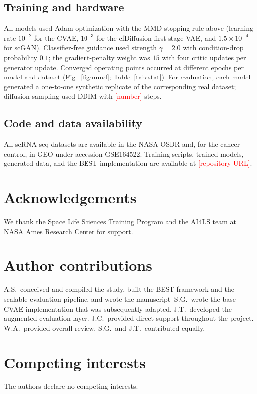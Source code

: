\documentclass[11pt]{article}
\newcommand{\fides}{BEST}
\newcommand{\res}[1]{\textcolor{red}{[#1]}}
\begin{document}
\subsection{Training and hardware}
All models used Adam optimization with the MMD stopping rule above (learning rate $10^{-2}$ for the CVAE, $10^{-3}$ for the cfDiffusion first-stage VAE, and $1.5\times10^{-4}$ for scGAN). Classifier-free guidance used strength $\gamma=2.0$ with condition-drop probability $0.1$; the gradient-penalty weight was $15$ with four critic updates per generator update. Converged operating points occurred at different epochs per model and dataset (Fig.~\ref{fig:mmd}; Table~\ref{tab:stat}). For evaluation, each model generated a one-to-one synthetic replicate of the corresponding real dataset; diffusion sampling used DDIM with \res{number} steps.

\subsection{Code and data availability}
All scRNA-seq datasets are available in the NASA OSDR \cite{osdr} and, for the cancer control, in GEO under accession GSE164522. Training scripts, trained models, generated data, and the \fides{} implementation are available at \res{repository URL}.

\section*{Acknowledgements}
We thank the Space Life Sciences Training Program and the AI4LS team at NASA Ames Research Center for support.

\section*{Author contributions}
A.S.\ conceived and compiled the study, built the \fides{} framework and the scalable evaluation pipeline, and wrote the manuscript. S.G.\ wrote the base CVAE implementation that was subsequently adapted. J.T.\ developed the augmented evaluation layer. J.C.\ provided direct support throughout the project. W.A.\ provided overall review. S.G.\ and J.T.\ contributed equally.

\section*{Competing interests}
The authors declare no competing interests.
\end{document}

